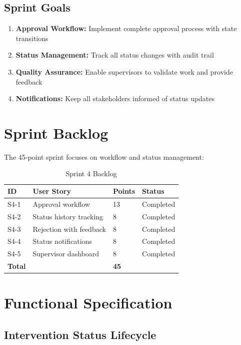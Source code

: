 \subsection{Sprint Goals}

\begin{enumerate}
\item \textbf{Approval Workflow:} Implement complete approval process with state transitions
\item \textbf{Status Management:} Track all status changes with audit trail
\item \textbf{Quality Assurance:} Enable supervisors to validate work and provide feedback
\item \textbf{Notifications:} Keep all stakeholders informed of status updates
\end{enumerate}

\section{Sprint Backlog}

The 45-point sprint focuses on workflow and status management:

\begin{table}[H]
\centering
\caption{Sprint 4 Backlog}
\label{tab:sprint4_backlog}
\begin{tabularx}{\textwidth}{|l|X|l|l|}
\hline
\textbf{ID} & \textbf{User Story} & \textbf{Points} & \textbf{Status} \\
\hline
S4-1 & Approval workflow & 13 & Completed \\
\hline
S4-2 & Status history tracking & 8 & Completed \\
\hline
S4-3 & Rejection with feedback & 8 & Completed \\
\hline
S4-4 & Status notifications & 8 & Completed \\
\hline
S4-5 & Supervisor dashboard & 8 & Completed \\
\hline
\textbf{Total} & & \textbf{45} & \\
\hline
\end{tabularx}
\end{table}

\section{Functional Specification}

\subsection{Intervention Status Lifecycle}

